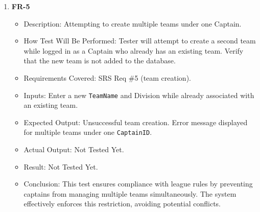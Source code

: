 \documentclass[12pt, titlepage]{article}
\begin{document}
\begin{enumerate}
      \item \textbf{FR-5}  
      \begin{itemize}
          \item Description: Attempting to create multiple teams under one Captain.
          \item How Test Will Be Performed: Tester will attempt to create a second team while logged in as a Captain who already has an existing team. Verify that the new team is not added to the database.
          \item Requirements Covered: SRS Req \#5 (team creation).
          \item Inputs: Enter a new \texttt{TeamName} and Division while already associated with an existing team.
          \item Expected Output: Unsuccessful team creation. Error message displayed for multiple teams under one \texttt{CaptainID}.
          \item Actual Output: Not Tested Yet.
          \item Result: Not Tested Yet.
          \item Conclusion: This test ensures compliance with league rules by preventing captains from managing multiple teams simultaneously.
		  The system effectively enforces this restriction, avoiding potential conflicts.
      \end{itemize}



\end{enumerate}
\end{document}
